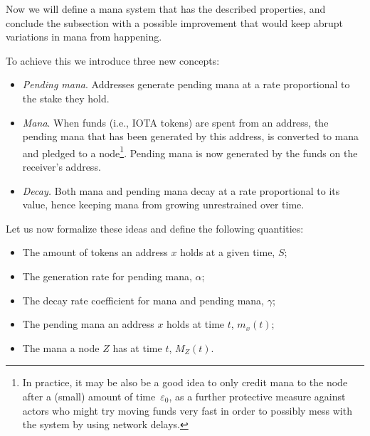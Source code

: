 \documentclass[../main.tex]{subfiles}
\begin{document}
Now we will define a mana system that has the described properties, and conclude the subsection with a possible improvement that would keep abrupt variations in mana from happening.

To achieve this we introduce three new concepts:

\begin{itemize}
    \item \textit{Pending mana}. Addresses generate pending mana at a rate proportional to the stake they hold.
    \item \textit{Mana}. When funds (i.e., IOTA tokens) are spent from an address, the pending mana that has been generated by this address, is converted to mana and pledged to a node\footnote{In practice, it may be also
    be a good idea to only credit mana to the node after a (small)
    amount of time~$\varepsilon_0$, as a further protective measure
    against actors who might try moving funds very fast in order 
    to possibly mess with the system by using network delays.}. 
    Pending mana is now generated by the funds on the receiver's address.
    \item \textit{Decay.} Both mana and pending mana decay at a rate proportional to its value, hence keeping mana from growing unrestrained over time. 
\end{itemize}


Let us now formalize these ideas and define the following quantities:
\begin{itemize}
    \item The amount of tokens an address $x$ holds
    at a given time, $S$;
    \item The generation rate for pending mana, $\alpha$;
    \item The decay rate coefficient for mana and pending mana, $\gamma$;
    \item The pending mana an address $x$ holds at time $t$, $m_x(t)$;
    \item The mana a node $Z$ has at time $t$, $M_Z(t)$.
\end{itemize}
 
\end{document}
